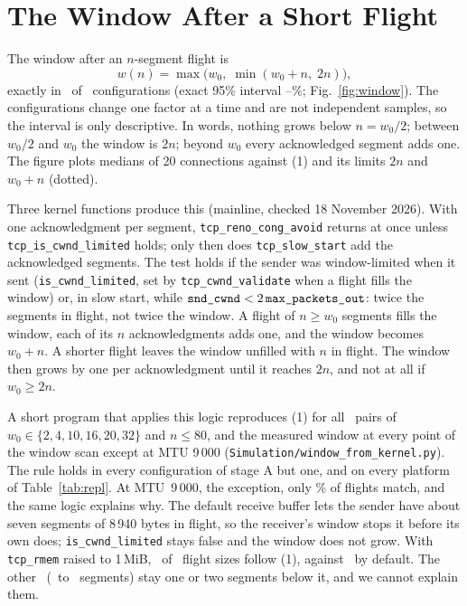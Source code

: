 \documentclass[sigconf,9pt,nonacm]{acmart}
\begin{document}
\section{The Window After a Short Flight}\label{sec:window}
The window after an $n$-segment flight is
\begin{equation}
w(n)=\max\bigl(w_0,\;\min(w_0+n,\;2n)\bigr),
\end{equation}
exactly in \NExact\ of \NCfg\ configurations (exact 95\% interval \CiWinLo--\CiWinHi\%; Fig.~\ref{fig:window}). The configurations change one factor at a time and are not independent samples, so the interval is only descriptive. In words, nothing grows below $n=w_0/2$; between $w_0/2$ and $w_0$ the window is $2n$; beyond $w_0$ every acknowledged segment adds one. The figure plots medians of 20 connections against (1) and its limits $2n$ and $w_0+n$ (dotted).

Three kernel functions produce this (mainline, checked 18 November 2026). With one acknowledgment per segment, \texttt{tcp\_\allowbreak reno\_\allowbreak cong\_\allowbreak avoid} returns at once unless \texttt{tcp\_\allowbreak is\_\allowbreak cwnd\_\allowbreak limited} holds; only then does \texttt{tcp\_\allowbreak slow\_\allowbreak start} add the acknowledged segments. The test holds if the sender was window-limited when it sent (\texttt{is\_\allowbreak cwnd\_\allowbreak limited}, set by \texttt{tcp\_\allowbreak cwnd\_\allowbreak validate} when a flight fills the window) or, in slow start, while $\texttt{snd\_\allowbreak cwnd}<2\,\texttt{max\_\allowbreak packets\_\allowbreak out}$: twice the segments in flight, not twice the window. A flight of $n\ge w_0$ segments fills the window, each of its $n$ acknowledgments adds one, and the window becomes $w_0+n$. A shorter flight leaves the window unfilled with $n$ in flight. The window then grows by one per acknowledgment until it reaches $2n$, and not at all if $w_0\ge 2n$.

A short program that applies this logic reproduces (1) for all \KernPairs\ pairs of $w_0\in\{2,4,10,16,20,32\}$ and $n\le 80$, and the measured window at every point of the window scan except at MTU 9\,000 (\texttt{Simulation/window\_\allowbreak from\_\allowbreak kernel.py}). The rule holds in every configuration of stage A but one, and on every platform of Table~\ref{tab:repl}. At MTU~9\,000, the exception, only \NineShare\% of flights match, and the same logic explains why. The default receive buffer lets the sender have about seven segments of 8\,940 bytes in flight, so the receiver's window stops it before its own does; \texttt{is\_\allowbreak cwnd\_\allowbreak limited} stays false and the window does not grow. With \texttt{tcp\_rmem} raised to 1\,MiB, \NineRwndLargeOk\ of \NineRwndLargeTot\ flight sizes follow (1), against \NineRwndDefOk\ by default. The other \NineFailNW\ (\NineFailLo\ to \NineFailHi\ segments) stay one or two segments below it, and we cannot explain them.
\end{document}
